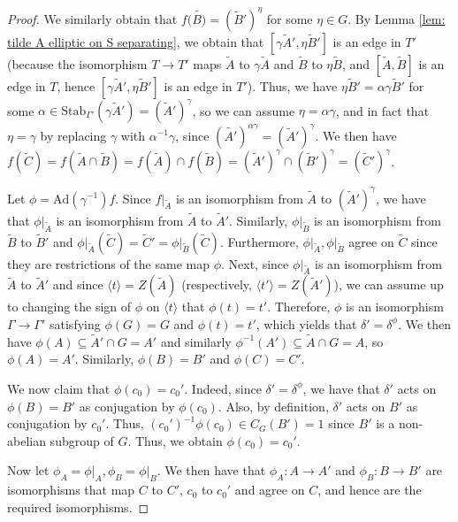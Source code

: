 \documentclass{amsart}
\theoremstyle{plain}
\theoremstyle{definition}
\theoremstyle{remark}
\begin{document}
\begin{proof}
     We similarly obtain that $f(\tilde{B)} = (\tilde{B}')^{\eta}$ for some $\eta \in G$. By Lemma \ref{lem: tilde A elliptic on S separating}, we obtain that $[\gamma \tilde{A}', \eta \tilde{B}']$ is an edge in $T'$ (because the isomorphism $T \to T'$ maps $\tilde{A}$ to $\gamma \tilde{A}$ and $\tilde{B}$ to $\eta \tilde{B}$, and $[\tilde{A}, \tilde{B}]$ is an edge in $T$, hence $[\gamma \tilde{A}', \eta \tilde{B}']$ is an edge in $T'$). Thus, we have $\eta \tilde{B}' = \alpha \gamma \tilde{B}'$ for some $\alpha \in \mathrm{Stab}_{\Gamma'}(\gamma \tilde{A}') = (\tilde{A}')^{\gamma}$, so we can assume $\eta = \alpha\gamma$, and in fact that $\eta = \gamma$ by replacing $\gamma$ with $\alpha^{-1} \gamma$, since $(\tilde{A'})^{\alpha \gamma} = (\tilde{A}')^{\gamma}$. We then have $f(\tilde{C}) = f(\tilde{A} \cap \tilde{B}) = f(\tilde{A}) \cap f(\tilde{B}) = (\tilde{A}')^{\gamma} \cap (\tilde{B}')^{\gamma} = (\tilde{C}')^{\gamma}$.
     
     Let $\phi = \mathrm{Ad}(\gamma^{-1})f$. Since $f \vert_{\tilde{A}}$ is an isomorphism from $\tilde{A}$ to $(\tilde{A}')^{\gamma}$, we have that $\phi \vert_{\tilde{A}}$ is an isomorphism from $\tilde{A}$ to $\tilde{A}'$. Similarly, $\phi \vert_{\tilde{B}}$ is an isomorphism from $\tilde{B}$ to $\tilde{B}'$ and $\phi \vert_{\tilde{A}}(\tilde{C}) = \tilde{C}' = \phi \vert_{\tilde{B}}(\tilde{C})$. Furthermore, $\phi \vert_{\tilde{A}}, \phi \vert_{\tilde{B}}$ agree on $\tilde{C}$ since they are restrictions of the same map $\phi$. Next, since $\phi \vert_{\tilde{A}}$ is an isomorphism from $\tilde{A}$ to $\tilde{A}'$ and since $\langle t \rangle = Z(\tilde{A})$ (respectively, $\langle t' \rangle = Z(\tilde{A}')$), we can assume up to changing the sign of $\phi$ on $\langle t \rangle$ that $\phi(t) = t'$. Therefore, $\phi$ is an isomorphism $\Gamma \to \Gamma'$ satisfying $\phi(G) = G$ and $\phi(t) = t'$, which yields that $\delta' = \delta^{\phi}$. We then have $\phi(A) \subseteq \tilde{A}' \cap G = A'$ and similarly $\phi^{-1}(A') \subseteq \tilde{A} \cap G = A$, so $\phi(A) = A'$. Similarly, $\phi(B) = B'$ and $\phi(C)=C'$.
     
     We now claim that $\phi(c_0) = c_0'$. Indeed, since $\delta' = \delta^{\phi}$, we have that $\delta'$ acts on $\phi(B) = B'$ as conjugation by $\phi(c_0)$. Also, by definition, $\delta'$ acts on $B'$ as conjugation by $c_0'$. Thus, $(c_0')^{-1}\phi(c_0) \in C_G(B') = 1$ since $B'$ is a non-abelian subgroup of $G$. Thus, we obtain $\phi(c_0) = c_0'$.

     Now let $\phi_A = \phi \vert_A, \phi_B = \phi \vert_B$. We then have that $\phi_A : A \to A'$ and $\phi_B : B \to B'$ are isomorphisms that map $C$ to $C'$, $c_0$ to $c_0'$ and agree on $C$, and hence are the required isomorphisms.
     

\end{proof}
\end{document}
